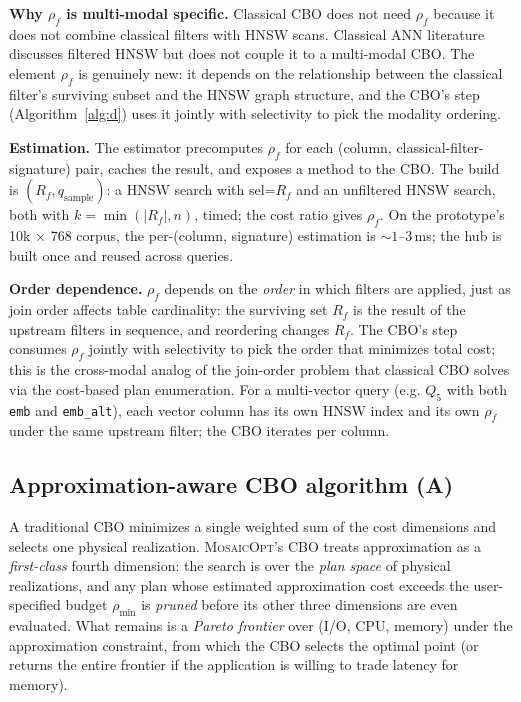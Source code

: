 \documentclass[sigconf,nonacm,review]{acmart}
\theoremstyle{plain}
\theoremstyle{definition}
\theoremstyle{remark}
\begin{document}
\noindent\textbf{Why $\rho_f$ is multi-modal specific.}
Classical CBO does not need $\rho_f$ because it does not
combine classical filters with HNSW scans. Classical ANN
literature \cite{acorn2022} discusses filtered HNSW but does
not couple it to a multi-modal CBO. The element $\rho_f$ is
genuinely new: it depends on the relationship between the
classical filter's surviving subset and the HNSW graph
structure, and the CBO's  step
(Algorithm~\ref{alg:d}) uses it jointly with selectivity to
pick the modality ordering.

\noindent\textbf{Estimation.} The estimator precomputes
$\rho_f$ for each (column, classical-filter-signature)
pair, caches the result, and exposes a
 method to the CBO. The build is
$(R_f, q_{\text{sample}})$:
a HNSW search with sel=$R_f$ and an unfiltered HNSW
search, both with $k = \min(|R_f|, n)$, timed; the cost
ratio gives $\rho_f$. On the prototype's 10k $\times$
768 corpus, the per-(column, signature) estimation is
$\sim 1$--$3$\,ms; the hub is built once and reused
across queries.

\noindent\textbf{Order dependence.} $\rho_f$ depends on
the \emph{order} in which filters are applied, just as
join order affects table cardinality: the surviving set
$R_f$ is the result of the upstream filters in sequence,
and reordering changes $R_f$. The CBO's
 step consumes $\rho_f$ jointly with
selectivity to pick the order that minimizes total cost;
this is the cross-modal analog of the join-order problem
that classical CBO solves via the cost-based plan
enumeration. For a multi-vector query (e.g. $Q_5$ with
both \texttt{emb} and \texttt{emb\_alt}), each vector
column has its own HNSW index and its own $\rho_f$ under
the same upstream filter; the CBO iterates per column.

\subsection{Approximation-aware CBO algorithm (A)}\label{sec:cbo:approx}

A traditional CBO minimizes a single weighted sum of the cost
dimensions and selects one physical realization. \textsc{MosaicOpt}'s
CBO treats approximation as a \emph{first-class} fourth dimension:
the search is over the \emph{plan space} of physical realizations,
and any plan whose estimated approximation cost exceeds the
user-specified budget $\rho_{\min}$ is \emph{pruned} before its
other three dimensions are even evaluated. What remains is a
\emph{Pareto frontier} over (I/O, CPU, memory) under the
approximation constraint, from which the CBO selects the optimal
point (or returns the entire frontier if the application is willing
to trade latency for memory).
\end{document}
